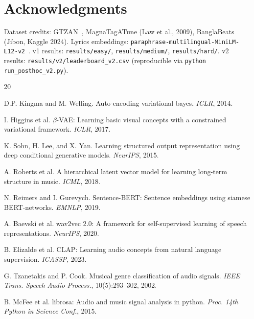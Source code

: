 \documentclass{article}
\begin{document}
\section*{Acknowledgments}
Dataset credits: GTZAN~\cite{tzanetakis2002musical}, MagnaTagATune (Law et al., 2009),
BanglaBeats (Jibon, Kaggle 2024).
Lyrics embeddings: \texttt{paraphrase-multilingual-MiniLM-L12-v2}~\cite{reimers2019sentence}.
v1 results: \texttt{results/easy/}, \texttt{results/medium/}, \texttt{results/hard/}.
v2 results: \texttt{results/v2/leaderboard\_v2.csv} (reproducible via
\texttt{python run\_posthoc\_v2.py}).

\clearpage

\begin{thebibliography}{20}

D.P. Kingma and M. Welling.
\newblock Auto-encoding variational bayes.
\newblock \textit{ICLR}, 2014.

I. Higgins et al.
\newblock $\beta$-VAE: Learning basic visual concepts with a constrained variational framework.
\newblock \textit{ICLR}, 2017.

K. Sohn, H. Lee, and X. Yan.
\newblock Learning structured output representation using deep conditional generative models.
\newblock \textit{NeurIPS}, 2015.

A. Roberts et al.
\newblock A hierarchical latent vector model for learning long-term structure in music.
\newblock \textit{ICML}, 2018.

N. Reimers and I. Gurevych.
\newblock Sentence-BERT: Sentence embeddings using siamese BERT-networks.
\newblock \textit{EMNLP}, 2019.

A. Baevski et al.
\newblock wav2vec 2.0: A framework for self-supervised learning of speech representations.
\newblock \textit{NeurIPS}, 2020.

B. Elizalde et al.
\newblock CLAP: Learning audio concepts from natural language supervision.
\newblock \textit{ICASSP}, 2023.

G. Tzanetakis and P. Cook.
\newblock Musical genre classification of audio signals.
\newblock \textit{IEEE Trans. Speech Audio Process.}, 10(5):293--302, 2002.

B. McFee et al.
\newblock librosa: Audio and music signal analysis in python.
\newblock \textit{Proc. 14th Python in Science Conf.}, 2015.


\end{thebibliography}
\end{document}

